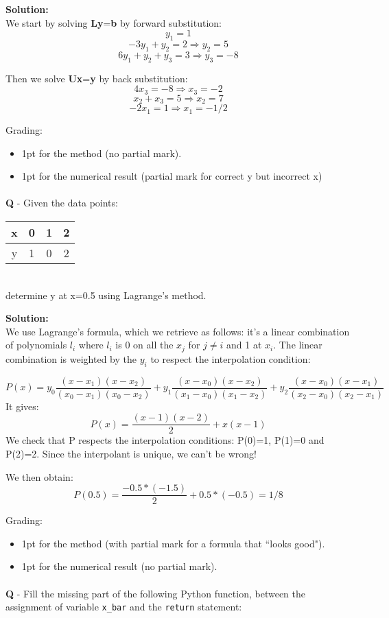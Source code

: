 \documentclass{llncs}
\newcounter{ques}
\renewcommand{\question}[1]{\paragraph{}\textbf{Q\theques} - #1\stepcounter{ques} }
\newcommand{\answer}[1]{\color{red}\textbf{Solution:}\\#1\color{black}}
\begin{document}
\answer{
We start by solving \textbf{Ly}=\textbf{b} by forward substitution:
$$
y_1 = 1
$$
$$
-3 y_1 + y_2 = 2 \Rightarrow y_2 = 5
$$
$$
6y_1 + y_2 + y_3 = 3 \Rightarrow y_3 = -8
$$

Then we solve \textbf{Ux}=\textbf{y} by back substitution:
$$
4x_3 = -8 \Rightarrow x_3 = -2
$$
$$
x_2 + x_3 = 5 \Rightarrow x_2 = 7
$$
$$
-2x_1 = 1 \Rightarrow x_1 = -1/2
$$


Grading:
\begin{itemize}
\item 1pt for the method (no partial mark).
\item 1pt for the numerical result (partial mark for correct y but incorrect x)
\end{itemize}
}


\newpage
\question{Given the data points:\\
\begin{tabular}{|c||c|c|c|}
\hline
x & 0 & 1 & 2 \\
\hline
y & 1 & 0 & 2\\
\hline
\end{tabular}\\
determine y at x=0.5 using Lagrange's method.
}

\answer{
We use Lagrange's formula, which we retrieve as follows: it's a linear combination
of polynomials $l_i$ where $l_i$ is 0 on all the $x_j$ for $j \neq i$ and 
1 at $x_i$. The linear combination is weighted by the $y_i$ to respect
the interpolation condition:

$$
P(x) = y_0 \frac{(x-x_1)(x-x_2)}{(x_0-x_1)(x_0-x_2)} +
       y_1 \frac{(x-x_0)(x-x_2)}{(x_1-x_0)(x_1-x_2)} +
       y_2 \frac{(x-x_0)(x-x_1)}{(x_2-x_0)(x_2-x_1)}
$$
It gives:
$$
P(x) = \frac{(x-1)(x-2)}{2} + x(x-1)
$$
We check that P respects the interpolation conditions: P(0)=1, P(1)=0 and P(2)=2. 
Since the interpolant is unique, we can't be wrong!

We then obtain:
$$
P(0.5) = \frac{-0.5*(-1.5)}{2} + 0.5*(-0.5) = 1/8
$$

Grading:
\begin{itemize}
\item 1pt for the method (with partial mark for a formula that ``looks good").
\item 1pt for the numerical result (no partial mark).
\end{itemize}
}

\newpage
\question{Fill the missing part of the following Python function, between
the assignment of variable \texttt{x\_bar} and the \texttt{return} statement:}
\end{document}
